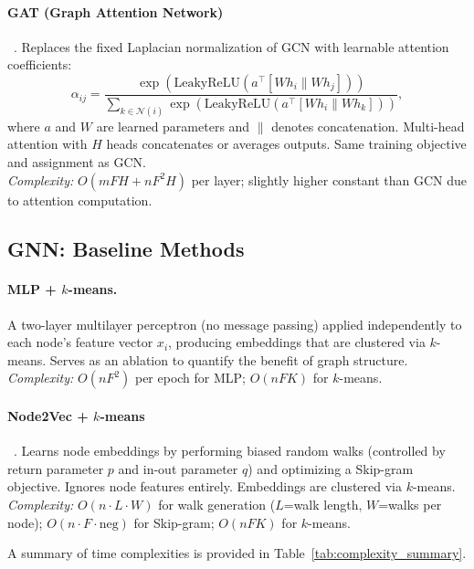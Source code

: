 \documentclass[11pt]{article}
\begin{document}
\paragraph{GAT (Graph Attention Network)}~\citep{velickovic_gat_2018}.
Replaces the fixed Laplacian normalization of GCN with learnable attention coefficients:
\[
\alpha_{ij} = \frac{\exp(\text{LeakyReLU}(a^\top [Wh_i \| Wh_j]))}{\sum_{k\in\mathcal{N}(i)}\exp(\text{LeakyReLU}(a^\top [Wh_i \| Wh_k]))},
\]
where $a$ and $W$ are learned parameters and $\|$ denotes concatenation. Multi-head attention with $H$ heads concatenates or averages outputs. Same training objective and assignment as GCN.\\
\emph{Complexity:} $O(mFH + nF^2H)$ per layer; slightly higher constant than GCN due to attention computation.

\subsection{GNN: Baseline Methods}

\paragraph{MLP + $k$-means.}
A two-layer multilayer perceptron (no message passing) applied independently to each node's feature vector $x_i$, producing embeddings that are clustered via $k$-means. Serves as an ablation to quantify the benefit of graph structure.\\
\emph{Complexity:} $O(nF^2)$ per epoch for MLP; $O(nFK)$ for $k$-means.

\paragraph{Node2Vec + $k$-means}~\citep{grover_node2vec_2016}.
Learns node embeddings by performing biased random walks (controlled by return parameter $p$ and in-out parameter $q$) and optimizing a Skip-gram objective. Ignores node features entirely. Embeddings are clustered via $k$-means.\\
\emph{Complexity:} $O(n \cdot L \cdot W)$ for walk generation ($L$=walk length, $W$=walks per node); $O(n \cdot F \cdot \text{neg})$ for Skip-gram; $O(nFK)$ for $k$-means.

\bigskip
\noindent A summary of time complexities is provided in Table~\ref{tab:complexity_summary}.
\end{document}
